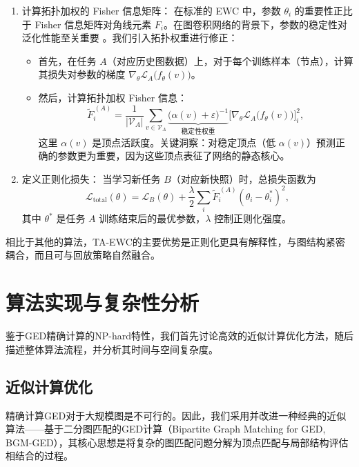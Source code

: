 \begin{enumerate}[label=\arabic*.]

  \item 计算拓扑加权的 Fisher 信息矩阵：  
        在标准的 EWC 中，参数 $\theta_i$ 的重要性正比于 Fisher 信息矩阵对角线元素 $F_i$。在图卷积网络的背景下，参数的稳定性对泛化性能至关重要 \cite{verma2019stability}。我们引入拓扑权重进行修正：
        \begin{itemize}[leftmargin=*,nosep]
          \item 首先，在任务 $A$（对应历史图数据）上，对于每个训练样本（节点），计算其损失对参数的梯度
                $\nabla_{\!\theta}\mathcal{L}_A\!\bigl(f_\theta(v)\bigr)$。

          \item 然后，计算拓扑加权 Fisher 信息：
                \[
                \widetilde{F}^{\,(A)}_i =
                \frac{1}{|\mathcal{V}_A|}
                \sum_{v\in\mathcal{V}_A}
                \underbrace{\bigl(\alpha(v)+\varepsilon\bigr)^{-1}}_{\text{稳定性权重}}
                \bigl[\nabla_{\!\theta}\mathcal{L}_A\!\bigl(f_\theta(v)\bigr)\bigr]^2_i,
                \]
                这里 $\alpha(v)$ 是顶点活跃度。关键洞察：对稳定顶点（低 $\alpha(v)$）预测正确的参数更为重要，因为这些顶点表征了网络的静态核心。
        \end{itemize}

  \item 定义正则化损失：  
        当学习新任务 $B$（对应新快照）时，总损失函数为
        \[
        \mathcal{L}_{\text{total}}(\theta)
        = \mathcal{L}_B(\theta)
        + \frac{\lambda}{2}\sum_i \widetilde{F}^{\,(A)}_i(\theta_i - \theta^*_i)^2,
        \]
        其中 $\theta^*$ 是任务 $A$ 训练结束后的最优参数，$\lambda$ 控制正则化强度。
\end{enumerate}

相比于其他的算法，TA-EWC的主要优势是正则化更具有解释性，与图结构紧密耦合，而且可与回放策略自然融合。

\chapter{算法实现与复杂性分析}
鉴于GED精确计算的NP-hard特性，我们首先讨论高效的近似计算优化方法，随后描述整体算法流程，并分析其时间与空间复杂度。

\section{近似计算优化}
精确计算GED对于大规模图是不可行的。因此，我们采用并改进一种经典的近似算法——基于二分图匹配的GED计算（Bipartite Graph Matching for GED, BGM-GED）\cite{riesen2009approximate}，其核心思想是将复杂的图匹配问题分解为顶点匹配与局部结构评估相结合的过程。

